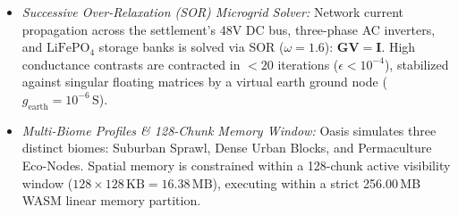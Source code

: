 \begin{enumerate}
\begin{itemize}
        \item \textit{Successive Over-Relaxation (SOR) Microgrid Solver:} Network current propagation across the settlement's 48V DC bus, three-phase AC inverters, and $\mathrm{LiFePO}_4$ storage banks is solved via SOR ($\omega = 1.6$): $\mathbf{G}\mathbf{V} = \mathbf{I}$. High conductance contrasts are contracted in $< 20$ iterations ($\epsilon < 10^{-4}$), stabilized against singular floating matrices by a virtual earth ground node ($g_{\mathrm{earth}} = 10^{-6}\,\mathrm{S}$).
        \item \textit{Multi-Biome Profiles \& 128-Chunk Memory Window:} Oasis simulates three distinct biomes: Suburban Sprawl, Dense Urban Blocks, and Permaculture Eco-Nodes. Spatial memory is constrained within a 128-chunk active visibility window ($128 \times 128\,\mathrm{KB} = 16.38\,\mathrm{MB}$), executing within a strict 256.00\,MB WASM linear memory partition.
    \end{itemize}


\end{enumerate}
